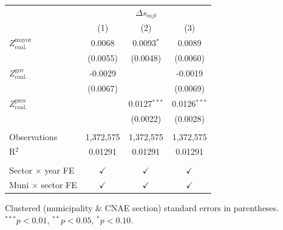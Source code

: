 \begingroup
\centering
\begin{tabular}{lccc}
   \toprule
    & \multicolumn{3}{c}{$\Delta s_{mjt}$}\\
                                       & (1)           & (2)            & (3)\\  
   \midrule 
   $Z^{\text{mayor}}_{\text{coal.}}$   & 0.0068        & 0.0093$^{*}$   & 0.0089\\   
                                       & (0.0055)      & (0.0048)       & (0.0060)\\   
   $Z^{\text{gov}}_{\text{coal.}}$     & -0.0029       &                & -0.0019\\   
                                       & (0.0067)      &                & (0.0069)\\   
   $Z^{\text{pres}}_{\text{coal.}}$    &               & 0.0127$^{***}$ & 0.0126$^{***}$\\   
                                       &               & (0.0022)       & (0.0028)\\   
    \\
   Observations                        & 1,372,575     & 1,372,575      & 1,372,575\\  
   R$^2$                               & 0.01291       & 0.01291        & 0.01291\\  
    \\
   Sector $\times$ year FE             & $\checkmark$  & $\checkmark$   & $\checkmark$\\   
   Muni $\times$ sector FE             & $\checkmark$  & $\checkmark$   & $\checkmark$\\   
   \bottomrule
\end{tabular}
 
\par \raggedright 
Clustered (municipality \& CNAE section) standard errors in parentheses. $^{***}p<0.01$, $^{**}p<0.05$, $^{*}p<0.10$.
\par\endgroup

